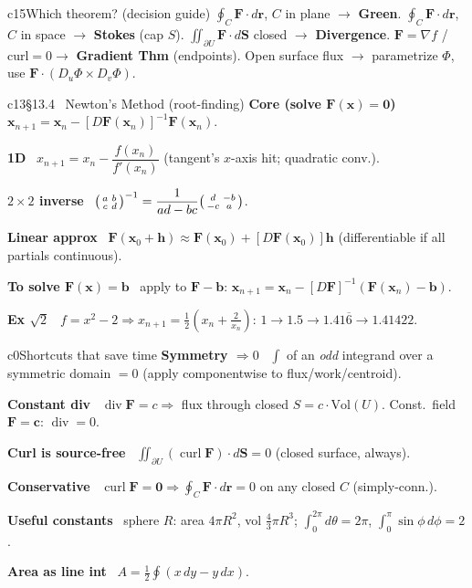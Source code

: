 \documentclass[10pt]{extarticle}
\newcommand{\h}[1]{{\bfseries #1}\ }
\newcommand{\key}[1]{\colorbox{hl}{$#1$}}
\newcommand{\grad}{\nabla}
\renewcommand{\div}{\operatorname{div}}
\newcommand{\curl}{\operatorname{curl}}
\newcommand{\F}{\mathbf{F}}
\newcommand{\rr}{\mathbf{r}}
\begin{document}
\begin{multicols}{2}
\begin{tbox}{c15}{Which theorem? (decision guide)}
\footnotesize
$\oint_C\F\cdot d\rr$, $C$ in plane $\to$ \textbf{Green}.\;
$\oint_C\F\cdot d\rr$, $C$ in space $\to$ \textbf{Stokes} (cap $S$).\;
$\iint_{\partial U}\F\cdot d\mathbf S$ closed $\to$ \textbf{Divergence}.\;
$\F=\grad f$ / curl$=0\to$ \textbf{Gradient Thm} (endpoints).\;
Open surface flux $\to$ parametrize $\Phi$, use $\F\cdot(D_u\Phi\times D_v\Phi)$.
\end{tbox}

\begin{tbox}{c13}{§13.4 \ Newton's Method (root-finding)}
\h{Core (solve $\F(\mathbf x)=\mathbf 0$)} \key{\mathbf x_{n+1}=\mathbf x_n-[D\F(\mathbf x_n)]^{-1}\F(\mathbf x_n)}.\par
\h{1D} $x_{n+1}=x_n-\dfrac{f(x_n)}{f'(x_n)}$ (tangent's $x$-axis hit; quadratic conv.).\par
\h{$2{\times}2$ inverse} $\begin{psmallmatrix}a&b\\c&d\end{psmallmatrix}^{-1}=\dfrac1{ad-bc}\begin{psmallmatrix}d&-b\\-c&a\end{psmallmatrix}$.\par
\h{Linear approx} $\F(\mathbf x_0{+}\mathbf h)\approx\F(\mathbf x_0)+[D\F(\mathbf x_0)]\mathbf h$ (differentiable if all partials continuous).\par
\h{To solve $\F(\mathbf x)=\mathbf b$} apply to $\F-\mathbf b$: $\mathbf x_{n+1}=\mathbf x_n-[D\F]^{-1}(\F(\mathbf x_n)-\mathbf b)$.\par
\h{Ex $\sqrt2$} $f=x^2-2\Rightarrow x_{n+1}=\tfrac12(x_n+\tfrac2{x_n})$: $1\!\to\!1.5\!\to\!1.41\overline{6}\!\to\!1.41422$.
\end{tbox}

\begin{tbox}{c0}{Shortcuts that save time}
\h{Symmetry $\Rightarrow0$} $\int$ of an \emph{odd} integrand over a symmetric domain $=0$ (apply componentwise to flux/work/centroid).\par
\h{Constant div} $\div\F=c\Rightarrow$ flux through closed $S=c\cdot\mathrm{Vol}(U)$. Const.\ field $\F=\mathbf c$: $\div=0$.\par
\h{Curl is source-free} $\iint_{\partial U}(\curl\F)\cdot d\mathbf S=0$ (closed surface, always).\par
\h{Conservative} $\curl\F=\mathbf0\Rightarrow\oint_C\F\cdot d\rr=0$ on any closed $C$ (simply-conn.).\par
\h{Useful constants} sphere $R$: area $4\pi R^2$, vol $\tfrac43\pi R^3$; $\int_0^{2\pi}\!d\theta{=}2\pi$, $\int_0^\pi\!\sin\phi\,d\phi{=}2$.\par
\h{Area as line int} $A=\tfrac12\oint(x\,dy-y\,dx)$.
\end{tbox}


\end{multicols}
\end{document}
